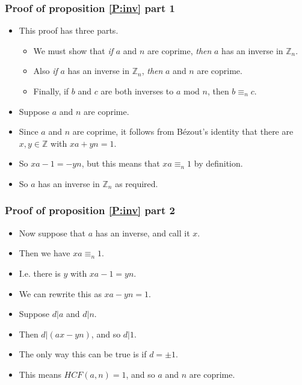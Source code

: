 \documentclass[handout]{beamer}
\newcommand{\bZ}{\mathbb{Z}}
\begin{document}
\begin{frame}
\frametitle{Proof of proposition \ref{P:inv} part 1}
\begin{itemize}
\item This proof has three parts. 
\vspace{0.2cm} 
\begin{itemize}
\item We must show that \emph{if} $a$ and $n$ are coprime, \emph{then} $a$ has an inverse in $\bZ_n$. 
\vspace{0.2cm} 
\item Also \emph{if} $a$ has an inverse in $\bZ_n$, \emph{then} $a$ and $n$ are coprime. 
\vspace{0.2cm} 
\item Finally, if $b$ and $c$ are both inverses to $a$ mod $n$, then $b\equiv_n c$.
\vspace{0.2cm} 
\end{itemize}
\item Suppose $a$ and $n$ are coprime. 
\vspace{0.2cm} 
\item Since $a$ and $n$ are coprime, it follows from B\'ezout's identity that there are $x,y\in\bZ$ with $xa + yn = 1$. 
\vspace{0.2cm} 
\item So $xa-1 = -yn$, but this means that $xa \equiv_n 1$ by definition. 
\vspace{0.2cm} 
\item So $a$ has an inverse in $\bZ_n$ as required.
\end{itemize}
\end{frame}

\begin{frame}
\frametitle{Proof of proposition \ref{P:inv} part 2}
\begin{itemize}
\item Now suppose that $a$ has an inverse, and call it $x$. 
\vspace{0.2cm} 
\item Then we have $xa \equiv_n 1$.
\vspace{0.2cm} 
\item I.e. there is $y$ with $xa - 1 = yn$. 
\vspace{0.2cm} 
\item We can rewrite this as $xa - yn = 1$. 
\vspace{0.2cm} 
\item Suppose $d|a$ and $d|n$. 
\vspace{0.2cm} 
\item Then $d|(ax-yn)$, and so $d|1$. 
\vspace{0.2cm} 
\item The only way this can be true is if $d=\pm 1$. 
\vspace{0.2cm} 
\item This means $HCF(a,n)=1$, and so $a$ and $n$ are coprime.
\end{itemize}
\end{frame}
\end{document}
